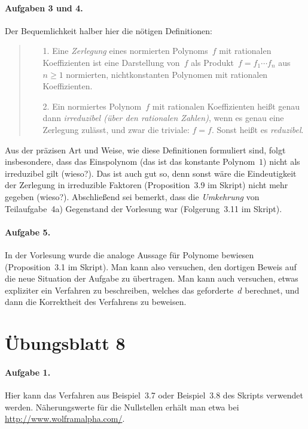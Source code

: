 \documentclass{../algblatt}
\begin{document}
\paragraph{Aufgaben 3 und 4.} Der Bequemlichkeit halber hier die nötigen
Definitionen:
\begin{quote}
\begin{enumerate}
\item[1.] Eine \emph{Zerlegung} eines normierten Polynoms~$f$ mit rationalen
Koeffizienten ist eine Darstellung von~$f$ als Produkt~$f = f_1 \cdots f_n$
aus~$n \geq 1$ normierten, nichtkonstanten Polynomen mit rationalen
Koeffizienten.
\item[2.] Ein normiertes Polynom~$f$ mit rationalen Koeffizienten heißt genau
dann \emph{irreduzibel (über den rationalen Zahlen)}, wenn es genau eine
Zerlegung zulässt, und zwar die triviale: $f = f$. Sonst heißt es
\emph{reduzibel}.
\end{enumerate}
\end{quote}
Aus der präzisen Art und Weise, wie diese Definitionen formuliert sind, folgt
insbesondere, dass das Einspolynom (das ist das konstante Polynom~$1$) nicht
als irreduzibel gilt (wieso?). Das ist auch gut so, denn sonst wäre die
Eindeutigkeit der Zerlegung in irreduzible Faktoren (Proposition~3.9 im Skript)
nicht mehr gegeben (wieso?). Abschließend sei bemerkt, dass die
\emph{Umkehrung} von Teilaufgabe~4a) Gegenstand der Vorlesung war
(Folgerung~3.11 im Skript).

\paragraph{Aufgabe 5.} In der Vorlesung wurde die analoge Aussage für Polynome
bewiesen (Proposition~3.1 im Skript). Man kann also versuchen, den dortigen
Beweis auf die neue Situation der Aufgabe zu übertragen. Man kann auch
versuchen, etwas expliziter ein Verfahren zu beschreiben, welches das
geforderte~$d$ berechnet, und dann die Korrektheit des Verfahrens zu beweisen.


\section*{Übungsblatt 8}

\paragraph{Aufgabe 1.} Hier kann das Verfahren aus Beispiel~3.7 oder
Beispiel~3.8 des Skripts verwendet werden. Näherungswerte für die Nullstellen
erhält man etwa bei \url{http://www.wolframalpha.com/}.
\end{document}
